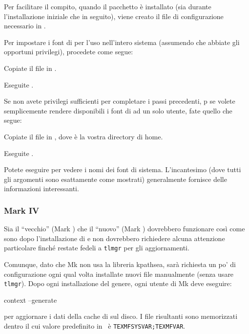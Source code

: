 \documentclass{article}
\begin{document}
Per facilitare il compito, quando il pacchetto  è
installato (sia durante l'installazione iniziale che in seguito), viene 
creato il file di configurazione necessario in
.

Per impostare i font di \TL{} per l'uso nell'intero sistema (assumendo che
abbiate gli opportuni privilegi), procedete come segue:
\begin{enumerate*}
\item Copiate il file  in
  .

\item Eseguite .
\end{enumerate*}

Se non avete privilegi sufficienti per completare i passi precedenti,
p se volete semplicemente rendere disponibili i font di \TL{} ad un
solo utente, fate quello che segue:
\begin{enumerate*}
\item Copiate il file  in
  , dove \filename{~} è la vostra directory di
  home.

\item Eseguite .
\end{enumerate*}

Potete eseguire  per vedere i nomi dei font di sistema.
L'incantesimo  (dove tutti gli
argomenti sono esattamente come mostrati) generalmente fornisce delle
informazioni interessanti.


\subsubsection{\ConTeXt{} Mark IV}
\label{sec:context-mkiv}

Sia il ``vecchio'' \ConTeXt{} (Mark ) che il ``nuovo'' \ConTeXt{}
(Mark ) dovrebbero funzionare così come sono dopo l'installazione
di \TL{} e non dovrebbero richiedere alcuna attenzione particolare finché
restate fedeli a \verb+tlmgr+ per gli aggiornamenti.

Comunque, dato che \ConTeXt{} Mk non usa la libreria kpathsea,
sarà richiesta un po' di configurazione ogni qual volta installate nuovi
file manualmente (senza usare \verb+tlmgr+). Dopo ogni installazione del
genere, ogni utente di Mk deve eseguire:
\begin{sverbatim}
context --generate
\end{sverbatim}
per aggiornare  i dati della cache di \ConTeXt{} sul disco.
I file risultanti sono memorizzati dentro  il cui valore
predefinito in \TL\ è \verb+TEXMFSYSVAR;TEXMFVAR+.
\end{document}
